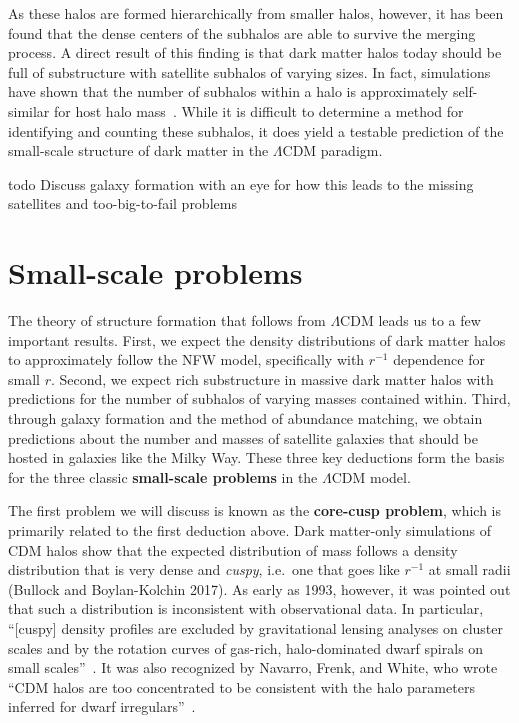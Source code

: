 As these halos are formed hierarchically from smaller halos, however, it
has been found that the dense centers of the subhalos are able to
survive the merging process. A direct result of this finding is that
dark matter halos today should be full of substructure with satellite
subhalos of varying sizes. In fact, simulations have shown that the
number of subhalos within a halo is approximately self-similar for host
halo mass~\cite{bullock_small-scale_2017}. While it is difficult to
determine a method for identifying and counting these subhalos, it does
yield a testable prediction of the small-scale structure of dark matter
in the \(\Lambda\)CDM paradigm.

todo Discuss galaxy formation with an eye for how this leads to the
missing satellites and too-big-to-fail problems

\hypertarget{small-scale-problems}{%
\section{Small-scale problems}\label{small-scale-problems}}

The theory of structure formation that follows from \(\Lambda\)CDM leads
us to a few important results. First, we expect the density
distributions of dark matter halos to approximately follow the NFW
model, specifically with \(r^{-1}\) dependence for small \(r\). Second,
we expect rich substructure in massive dark matter halos with
predictions for the number of subhalos of varying masses contained
within. Third, through galaxy formation and the method of abundance
matching, we obtain predictions about the number and masses of satellite
galaxies that should be hosted in galaxies like the Milky Way. These
three key deductions form the basis for the three classic
\textbf{small-scale problems} in the \(\Lambda\)CDM model.

The first problem we will discuss is known as the \textbf{core-cusp problem},
which is primarily related to the first deduction above. Dark matter-only
simulations of CDM halos show that the expected distribution of mass follows a
density distribution that is very dense and \emph{cuspy}, i.e.~one that goes
like \(r^{-1}\) at small radii (Bullock and Boylan-Kolchin 2017). As early as
1993, however, it was pointed out that such a distribution is inconsistent
with observational data. In particular, ``{[}cuspy{]} density profiles are
excluded by gravitational lensing analyses on cluster scales and by the
rotation curves of gas-rich, halo-dominated dwarf spirals on small
scales''~\cite{flores_rotation_1993}. It was also recognized by Navarro,
Frenk, and White, who wrote ``CDM halos are too concentrated to be consistent
with the halo parameters inferred for dwarf
irregulars''~\cite{navarro_structure_1995}.

